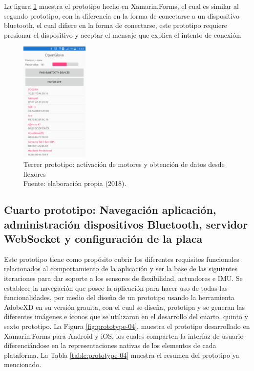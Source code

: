 La figura \ref{fig:prototype-03} muestra el prototipo hecho en Xamarin.Forms, el cual es similar al segundo prototipo, con la diferencia en la forma de conectarse a un dispositivo bluetooth, el cual difiere en la forma de conectarse, este prototipo requiere presionar el dispositivo y aceptar el mensaje que explica el intento de conexión.


\begin{figure}[H]
	\centering
	\captionsetup{justification=centering}
   	\includegraphics[width=0.3\textwidth]{images/chapter03/03-prototype.png} 
            \caption[Tercer prototipo: activación de motores y obtención de datos desde flexores]{Tercer prototipo: activación de motores y obtención de datos desde flexores \\ Fuente: elaboración propia (2018).}
    \label{fig:prototype-03}
\end{figure}





\subsection{Cuarto prototipo: Navegación aplicación, administración dispositivos Bluetooth, servidor WebSocket y configuración de la placa}
\label{cuarto-prototipo}
Este prototipo tiene como propósito cubrir los diferentes requisitos funcionales relacionados al comportamiento de la aplicación y ser la base de las siguientes iteraciones para dar soporte a los sensores de flexibilidad, actuadores e IMU. Se establece la navegación que posee la aplicación para hacer uso de todas las funcionalidades, por medio del diseño de un prototipo usando la herramienta AdobeXD en su versión grauita, con el cual se diseña, prototipa y se generan las diferentes imágenes e íconos que se utilizaron en el desarrollo del cuarto, quinto y sexto prototipo. La Figura \ref{fig:prototype-04}, muestra el prototipo desarrollado en Xamarin.Forms para Android y iOS, los cuales comparten la interfaz de usuario diferenciándose en la representaciones nativas de los elementos de cada plataforma. La Tabla \ref{table:prototype-04} muestra el resumen del prototipo ya mencionado.



